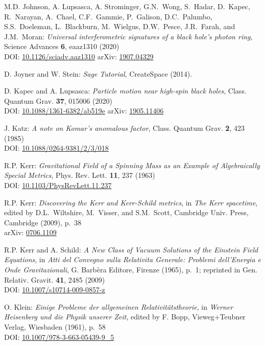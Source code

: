 \begin{thebibliography}{123}
M.D. Johnson, A. Lupsasca, A. Strominger, G.N.~Wong, S.~Hadar, D.~Kapec, R.~Narayan, A.~Chael,
C.F.~Gammie, P.~Galison, D.C.~Palumbo, S.S.~Doeleman, L.~Blackburn, M.~Wielgus, D.W.~Pesce,
J.R.~Farah, and J.M.~Moran:
{\em Universal interferometric signatures of a black hole's photon ring},
Science Advances {\bf 6}, eaaz1310 (2020)\\
DOI: \href{https://doi.org/10.1126/sciadv.aaz1310}{10.1126/sciadv.aaz1310}\hfill
arXiv: \href{https://arxiv.org/abs/1907.04329}{1907.04329}

D. Joyner and W. Stein: {\em Sage Tutorial}, CreateSpace (2014).

D. Kapec and A. Lupsasca:
{\em Particle motion near high-spin black holes},
Class. Quantum Grav. {\bf 37}, 015006 (2020)\\
DOI: \href{https://doi.org/10.1088/1361-6382/ab519e}{10.1088/1361-6382/ab519e}\hfill
arXiv: \href{https://arxiv.org/abs/1905.11406}{1905.11406}

J. Katz:
{\em A note on Komar's anomalous factor},
Class. Quantum Grav. {\bf 2}, 423 (1985)\\
DOI: \href{https://doi.org/10.1088/0264-9381/2/3/018}{10.1088/0264-9381/2/3/018}

R.P. Kerr:
{\em Gravitational Field of a Spinning Mass as an Example of Algebraically Special Metrics},
Phys. Rev. Lett. {\bf 11}, 237 (1963)\\
DOI: \href{https://doi.org/10.1103/PhysRevLett.11.237}{10.1103/PhysRevLett.11.237}

R.P. Kerr: {\em Discovering the Kerr and Kerr-Schild metrics},
in {\em The Kerr spacetime}, edited by D.L.~Wiltshire, M.~Visser, and S.M.~Scott,
Cambridge Univ. Press, Cambridge (2009), p.~38\\
arXiv: \href{https://arxiv.org/abs/0706.1109}{0706.1109}

R.P. Kerr and A. Schild:
{\em A New Class of Vacuum Solutions of the Einstein Field Equations},
in {\em Atti del Convegno sulla Relativita Generale: Problemi
dell’Energia e Onde Gravitazionali}, G. Barbèra Editore,
Firenze (1965), p.~1; reprinted in
Gen. Relativ. Gravit. {\bf 41}, 2485 (2009)\\
DOI: \href{https://doi.org/10.1007/s10714-009-0857-z}{10.1007/s10714-009-0857-z}

O. Klein:
{\em Einige Probleme der allgemeinen Relativitätstheorie},
in {\em Werner Heisenberg und die Physik unserer Zeit},
edited by F. Bopp, Vieweg+Teubner Verlag, Wiesbaden (1961), p.~58\\
DOI: \href{https://doi.org/10.1007/978-3-663-05439-9_5}{10.1007/978-3-663-05439-9\_5}


\end{thebibliography}
